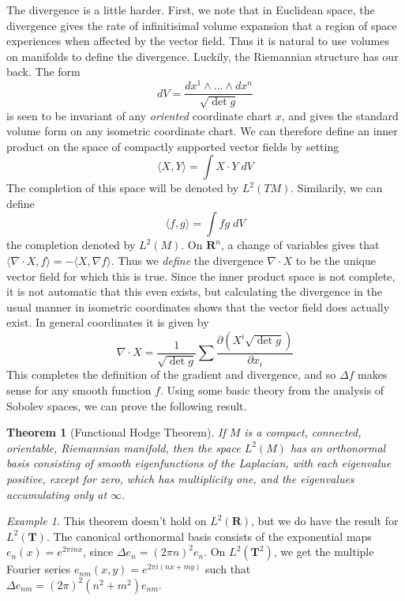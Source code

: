 \documentclass{article}
\theoremstyle{plain}
\newtheorem{theorem}{Theorem}
\theoremstyle{remark}
\newtheorem*{example}{Example}
\theoremstyle{definition}
\begin{document}
The divergence is a little harder. First, we note that in Euclidean space, the divergence gives the rate of infinitisimal volume expansion that a region of space experiences when affected by the vector field. Thus it is natural to use volumes on manifolds to define the divergence. Luckily, the Riemannian structure has our back. The form
%
\[ dV = \frac{dx^1 \wedge \dots \wedge dx^n}{\sqrt{\det g}}  \]
%
is seen to be invariant of any {\it oriented} coordinate chart $x$, and gives the standard volume form on any isometric coordinate chart. We can therefore define an inner product on the space of compactly supported vector fields by setting
%
\[ \langle X, Y \rangle = \int X \cdot Y\; dV \]
%
The completion of this space will be denoted by $L^2(TM)$. Similarily, we can define
%
\[ \langle f, g \rangle = \int fg\; dV \]
%
the completion denoted by $L^2(M)$. On $\mathbf{R}^n$, a change of variables gives that $\langle \nabla \cdot X, f \rangle = - \langle X, \nabla f \rangle$. Thus we {\it define} the divergence $\nabla \cdot X$ to be the unique vector field for which this is true. Since the inner product space is not complete, it is not automatic that this even exists, but calculating the divergence in the usual manner in isometric coordinates shows that the vector field does actually exist. In general coordinates it is given by
%
\[ \nabla \cdot X = \frac{1}{\sqrt{\det g}} \sum \frac{\partial (X^i \sqrt{\det g})}{\partial x_i} \]
%
This completes the definition of the gradient and divergence, and so $\Delta f$ makes sense for any smooth function $f$. Using some basic theory from the analysis of Sobolev spaces, we can prove the following result.

\begin{theorem}[Functional Hodge Theorem]
    If $M$ is a compact, connected, orientable, Riemannian manifold, then the space $L^2(M)$ has an orthonormal basis consisting of smooth eigenfunctions of the Laplacian, with each eigenvalue positive, except for zero, which has multiplicity one, and the eigenvalues accumulating only at $\infty$.
\end{theorem}

\begin{example}
    This theorem doesn't hold on $L^2(\mathbf{R})$, but we do have the result for $L^2(\mathbf{T})$. The canonical orthonormal basis consists of the exponential maps $e_n(x) = e^{2 \pi i n x}$, since $\Delta e_n = (2 \pi n)^2 e_n$. On $L^2(\mathbf{T}^2)$, we get the multiple Fourier series $e_{nm}(x,y) = e^{2 \pi i (n x + m y)}$ such that $\Delta e_{nm} = (2 \pi)^2 (n^2 + m^2) e_{nm}$.
\end{example}
\end{document}
